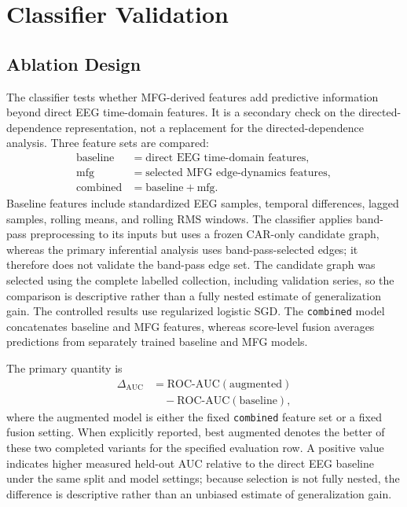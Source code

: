 \documentclass[10pt,journal]{IEEEtran}
\newcommand{\code}[1]{\texttt{#1}}
\begin{document}
\section{Classifier Validation}
\subsection{Ablation Design}
The classifier tests whether MFG-derived features add predictive information beyond direct EEG time-domain features. It is a secondary check on the directed-dependence representation, not a replacement for the directed-dependence analysis. Three feature sets are compared:
\begin{equation}
    \begin{split}
        \text{baseline} & = \text{direct EEG time-domain features},     \\
        \text{mfg}      & = \text{selected MFG edge-dynamics features}, \\
        \text{combined} & = \text{baseline} + \text{mfg}.
    \end{split}
\end{equation}
Baseline features include standardized EEG samples, temporal differences, lagged samples, rolling means, and rolling RMS windows. The classifier applies band-pass preprocessing to its inputs but uses a frozen CAR-only candidate graph, whereas the primary inferential analysis uses band-pass-selected edges; it therefore does not validate the band-pass edge set. The candidate graph was selected using the complete labelled collection, including validation series, so the comparison is descriptive rather than a fully nested estimate of generalization gain. The controlled results use regularized logistic SGD. The \code{combined} model concatenates baseline and MFG features, whereas score-level fusion averages predictions from separately trained baseline and MFG models.

The primary quantity is
\begin{equation}
    \begin{aligned}
        \Delta_{\mathrm{AUC}} & =
        \mathrm{ROC\mbox{-}AUC}(\mathrm{augmented}) \\
        & \quad - \mathrm{ROC\mbox{-}AUC}(\mathrm{baseline}),
    \end{aligned}
\end{equation}
where the augmented model is either the fixed \code{combined} feature set or a fixed fusion setting. When explicitly reported, best augmented denotes the better of these two completed variants for the specified evaluation row. A positive value indicates higher measured held-out AUC relative to the direct EEG baseline under the same split and model settings; because selection is not fully nested, the difference is descriptive rather than an unbiased estimate of generalization gain.
\end{document}
